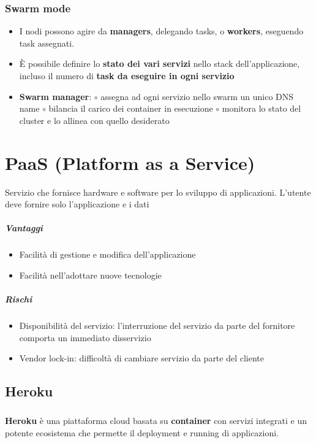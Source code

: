 \documentclass[a4paper, 12pt]{report}
\begin{document}
    \subsection{Swarm mode}
    \begin{itemize}
      \item I nodi possono agire da \textbf{managers}, delegando tasks, o \textbf{workers}, eseguendo task assegnati.
      \item È possibile definire lo \textbf{stato dei vari servizi} nello stack dell'applicazione, incluso il numero di \textbf{task da eseguire in ogni servizio}
      \item \textbf{Swarm manager}:
        \subitem $\circ$ assegna ad ogni servizio nello swarm un unico DNS name
        \subitem $\circ$ bilancia il carico dei container in esecuzione 
        \subitem $\circ$ monitora lo stato del cluster e lo allinea con quello desiderato
    \end{itemize}
    \chapter{PaaS (Platform as a Service)}
      Servizio che fornisce hardware e software per lo sviluppo di applicazioni. L'utente deve fornire solo l'applicazione e i dati
    \paragraph{Vantaggi}
    \begin{itemize}
      \item Facilità di gestione e modifica dell'applicazione
      \item Facilità nell'adottare nuove tecnologie
    \end{itemize}
    \paragraph{Rischi}
    \begin{itemize}
      \item Disponibilità del servizio: l'interruzione del servizio da parte del fornitore comporta un immediato disservizio
      \item Vendor lock-in: difficoltà di cambiare servizio da parte del cliente
    \end{itemize}
      \section{Heroku}
      \paragraph{}\textbf{Heroku} è una piattaforma cloud basata su \textbf{container} con servizi integrati e un potente ecosistema che permette il deployment e running di applicazioni.
\end{document}
